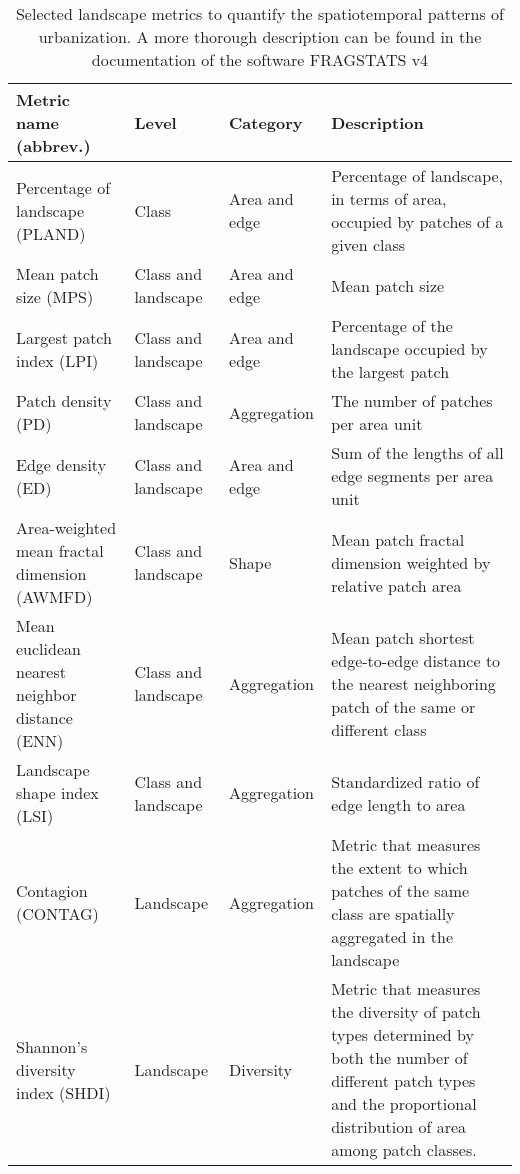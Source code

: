 \begin{table}[!h]
    \footnotesize %
    \renewcommand{\arraystretch}{1.3} %
    \centering
    \caption[Selected landscape metrics]{\label{selected-metrics}Selected landscape metrics to quantify the spatiotemporal patterns of urbanization. A more thorough description can be found in the documentation of the software FRAGSTATS v4 \citep{mcgarigal2012fragstats}}
    \begin{tabular}{p{} p{} p{} p{}} 
      \toprule
      \textbf{Metric name (abbrev.)} & \textbf{Level} & \textbf{Category} & \textbf{Description} \\
      \midrule
      Percentage of landscape (PLAND) & Class & Area and edge & Percentage of landscape, in terms of area, occupied by patches of a given class \\
      Mean patch size (MPS) & Class and landscape & Area and edge & Mean patch size \\
      Largest patch index (LPI) & Class and landscape & Area and edge & Percentage of the landscape occupied by the largest patch \\
      Patch density (PD) & Class and landscape & Aggregation & The number of patches per area unit \\
      Edge density (ED) & Class and landscape & Area and edge & Sum of the lengths of all edge segments per area unit \\
      Area-weighted mean fractal dimension (AWMFD) & Class and landscape & Shape & Mean patch fractal dimension weighted by relative patch area \\
      Mean euclidean nearest neighbor distance (ENN) & Class and landscape & Aggregation & Mean patch shortest edge-to-edge distance to the nearest neighboring patch of the same or different class \\
      Landscape shape index (LSI) & Class and landscape & Aggregation & Standardized ratio of edge length to area \\
      Contagion (CONTAG) & Landscape & Aggregation & Metric that measures the extent to which patches of the same class are spatially aggregated in the landscape \\
      Shannon's diversity index (SHDI) & Landscape & Diversity & Metric that measures the diversity of patch types determined by both the number of different patch types and the proportional distribution of area among patch classes. \\
      \bottomrule  
    \end{tabular}
\end{table}

